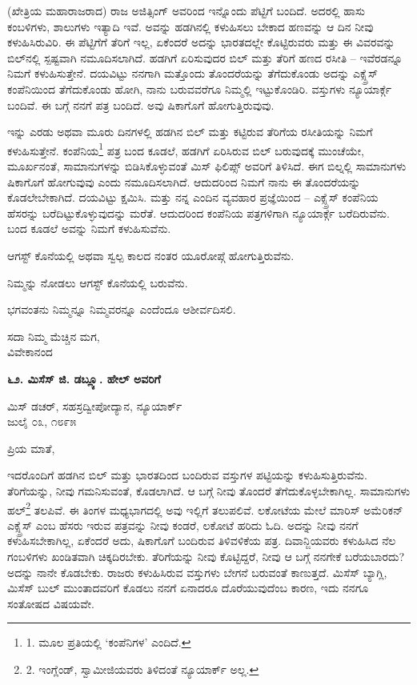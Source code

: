 (ಖೇತ್ರಿಯ ಮಹಾರಾಜರಾದ) ರಾಜ ಅಜಿತ್ಸಿಂಗ್ ಅವರಿಂದ ಇನ್ನೊಂದು ಪೆಟ್ಟಿಗೆ ಬಂದಿದೆ. ಅದರಲ್ಲಿ ಹಾಸು ಕಂಬಳಿಗಳು, ಶಾಲುಗಳು ಇತ್ಯಾದಿ ಇವೆ. ಅವನ್ನು ಹಡಗಿನಲ್ಲಿ ಕಳುಹಿಸಲು ಬೇಕಾದ ಹಣವನ್ನು ಆ ದಿನ ನೀವು ಕಳುಹಿಸಿರುವಿರಿ. ಈ ಪೆಟ್ಟಿಗೆಗೆ ತೆರಿಗೆ ಇಲ್ಲ, ಏಕೆಂದರೆ ಅದನ್ನು ಭಾರತದಲ್ಲೇ ಕೊಟ್ಟಿರುವರು ಮತ್ತು ಈ ವಿವರವನ್ನು ಬಿಲ್‌ನಲ್ಲಿ ಸ್ಪಷ್ಟವಾಗಿ ನಮೂದಿಸಲಾಗಿದೆ. ಹಡಗಿಗೆ ಏರಿಸುವುದರ ಬಿಲ್ ಮತ್ತು ತೆರಿಗೆ ಹಣದ ರಸೀತಿ – ಇವೆರಡನ್ನೂ ನಿಮಗೆ ಕಳುಹಿಸುತ್ತೇನೆ. ದಯವಿಟ್ಟು ನನಗಾಗಿ ಮತ್ತೊಂದು ತೊಂದರೆಯನ್ನು ತೆಗೆದುಕೊಂಡು ಅದನ್ನು ಎಕ್ಸ್ಪ್ರೆಸ್ ಕಂಪೆನಿಯಿಂದ ತೆಗೆದುಕೊಂಡು ಹೋಗಿ, ನಾನು ಬರುವವರೆಗೂ ನಿಮ್ಮಲ್ಲಿ ಇಟ್ಟುಕೊಂಡಿರಿ. ವಸ್ತುಗಳು ನ್ಯೂಯಾರ್ಕ್ಗೆ ಬಂದಿವೆ. ಈ ಬಗ್ಗೆ ನನಗೆ ಪತ್ರ ಬಂದಿದೆ. ಅವು ಷಿಕಾಗೊಗೆ ಹೋಗುತ್ತಿರುವುವು.

ಇನ್ನು ಎರಡು ಅಥವಾ ಮೂರು ದಿನಗಳಲ್ಲಿ ಹಡಗಿನ ಬಿಲ್ ಮತ್ತು ಕಟ್ಟಿರುವ ತೆರಿಗೆಯ ರಸೀತಿಯನ್ನು ನಿಮಗೆ ಕಳುಹಿಸುತ್ತೇನೆ. ಕಂಪೆನಿಯ\footnote{1. ಮೂಲ ಪ್ರತಿಯಲ್ಲಿ ‘ಕಂಪೆನಿಗಳ’ ಎಂದಿದೆ.} ಪತ್ರ ಬಂದ ಕೂಡಲೆ, ಹಡಗಿಗೆ ಏರಿಸಿರುವ ಬಿಲ್ ಬರುವುದಕ್ಕೆ ಮುಂಚೆಯೇ, ಮೂರ್ಖನಂತೆ, ಸಾಮಾನುಗಳನ್ನು ಬಿಡಿಸಿಕೊಳ್ಳುವಂತೆ ಮಿಸ್ ಫಿಲಿಪ್ಸ್ ಅವರಿಗೆ ತಿಳಿಸಿದೆ. ಈಗ ಬಿಲ್ನಲ್ಲಿ ಸಾಮಾನುಗಳು ಷಿಕಾಗೊಗೆ ಹೋಗುವುವು ಎಂದು ನಮೂದಿಸಲಾಗಿದೆ. ಆದುದರಿಂದ ನಿಮಗೆ ನಾನು ಈ ತೊಂದರೆಯನ್ನು ಕೊಡಲೇಬೇಕಾಗಿದೆ. ದಯವಿಟ್ಟು ಕ್ಷಮಿಸಿ. ಮತ್ತು ನನ್ನ ಎಂದಿನ ವ್ಯವಹಾರ ಪ್ರಜ್ಞೆಯಿಂದ – ಎಕ್ಸ್ಪ್ರೆಸ್ ಕಂಪೆನಿಯ ಹೆಸರನ್ನು ಬರೆದಿಟ್ಟುಕೊಳ್ಳುವುದನ್ನು ಮರೆತೆ. ಆದುದರಿಂದ ಕಂಪೆನಿಯ ಪತ್ರಗಳಿಗಾಗಿ ನ್ಯೂಯಾರ್ಕ್ಗೆ ಬರೆದಿರುವೆನು. ಬಂದ ಕೂಡಲೆ ಅವನ್ನು ನಿಮಗೆ ಕಳುಹಿಸುವೆನು.

ಆಗಸ್ಟ್ ಕೊನೆಯಲ್ಲಿ ಅಥವಾ ಸ್ವಲ್ಪ ಕಾಲದ ನಂತರ ಯೂರೋಪ್ಗೆ ಹೋಗುತ್ತಿರುವೆನು.

ನಿಮ್ಮನ್ನು ನೋಡಲು ಆಗಸ್ಟ್ ಕೊನೆಯಲ್ಲಿ ಬರುವೆನು.

ಭಗವಂತನು ನಿಮ್ಮನ್ನೂ ನಿಮ್ಮವರನ್ನೂ ಎಂದೆಂದೂ ಆಶೀರ್ವದಿಸಲಿ.

\begin{flushright}
ಸದಾ ನಿಮ್ಮ ಮೆಚ್ಚಿನ ಮಗ,\\ವಿವೇಕಾನಂದ
\end{flushright}

\begin{center}
\textbf{೬೨. ಮಿಸೆಸ್ ಜಿ. ಡಬ್ಲ್ಯೂ. ಹೇಲ್ ಅವರಿಗೆ}
\end{center}

\begin{flushright}
 ಮಿಸ್ ಡಚರ್, ಸಹಸ್ರದ್ವೀಪೋದ್ಯಾನ, ನ್ಯೂಯಾರ್ಕ್\\ಜುಲೈ ೦೩, ೧೮೯೫
\end{flushright}

ಪ್ರಿಯ ಮಾತೆ,

ಇದರೊಂದಿಗೆ ಹಡಗಿನ ಬಿಲ್ ಮತ್ತು ಭಾರತದಿಂದ ಬಂದಿರುವ ವಸ್ತುಗಳ ಪಟ್ಟಿಯನ್ನು ಕಳುಹಿಸುತ್ತಿರುವೆನು. ತೆರಿಗೆಯನ್ನು, ನೀವು ಗಮನಿಸುವಂತೆ, ಕೊಡಲಾಗಿದೆ. ಆ ಬಗ್ಗೆ ನೀವು ತೊಂದರೆ ತೆಗೆದುಕೊಳ್ಳಬೇಕಾಗಿಲ್ಲ. ಸಾಮಾನುಗಳು ಹಲ್\footnote{2. ಇಂಗ್ಲೆಂಡ್, ಸ್ವಾಮೀಜಿಯವರು ತಿಳಿದಂತೆ ನ್ಯೂಯಾರ್ಕ್ ಅಲ್ಲ.} ತಲಪಿವೆ. ಈ ತಿಂಗಳ ಮಧ್ಯಭಾಗದಲ್ಲಿ ಅವು ಇಲ್ಲಿಗೆ ತಲುಪಲಿವೆ. ಲಕೋಟೆಯ ಮೇಲೆ ಮಾರಿಸ್ ಅಮೆರಿಕನ್ ಎಕ್ಸ್ಪ್ರೆಸ್ ಎಂಬ ಹೆಸರು ಇರುವ ಪತ್ರವನ್ನು ನೀವು ಕಂಡರೆ, ಲಕೋಟೆ ಹರಿದು ಓದಿ. ಅದನ್ನು ನೀವು ನನಗೆ ಕಳುಹಿಸಬೇಕಾಗಿಲ್ಲ, ಏಕೆಂದರೆ ಅದು, ಷಿಕಾಗೊಗೆ ಬಂದಿರುವ ತಿಳಿವಳಿಕೆಯ ಪತ್ರ. ದಿವಾನ್ಜಿಯವರು ಕಳುಹಿಸಿದ ನೆಲ ಗಂಬಳಿಗಳು ಖಂಡಿತವಾಗಿ ಚಿಕ್ಕದಿರಬೇಕು. ತೆರಿಗೆಯನ್ನು ನೀವು ಕೊಟ್ಟಿದ್ದರೆ, ನೀವು ಆ ಬಗ್ಗೆ ನನಗೇಕೆ ಬರೆಯಬಾರದು? ಅದನ್ನು ನಾನೇ ಕೊಡಬೇಕು. ರಾಜರು ಕಳುಹಿಸಿರುವ ವಸ್ತುಗಳು ಬೇಗನೆ ಬರುವಂತೆ ಕಾಣುತ್ತದೆ. ಮಿಸೆಸ್ ಬ್ಯಾಗ್ಲಿ, ಮಿಸೆಸ್ ಬುಲ್ ಮುಂತಾದವರಿಗೆ ಕೊಡಲು ನನಗೆ ಏನಾದರೂ ದೊರೆಯುವುದೆಂಬ ಕಾರಣ, ಇದು ನನಗೂ ಸಂತೋಷದ ವಿಷಯವೇ.

